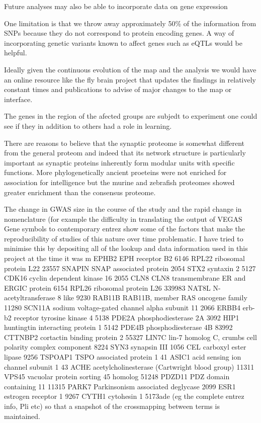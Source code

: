 Future analyses may also be able to incorporate data on gene expression

One limitation is that we throw away approximately 50\% of the information from SNPs because they do not correspond to protein encoding genes. A way of incorporating genetic variants known to affect genes such as eQTLs would be helpful. 

Ideally given the continuous evolution of the map and the analysis we would have an online resource like the fly brain project that updates the findings in relatively constant times and publications to advise of major changes to the map or interface. 

The genes in the region of the afected groups are subjedt to experiment one could see if they in addition to others had a role in learning.

There are reasons to believe that the synaptic proteome is somewhat different from the general proteom and indeed that its network structure is particularly important as synaptic proteins inherently form modular units with specific functions. More phylogenetically ancient proeteins were not enriched for association for intelligence but the murine and zebrafish proteomes showed greater enrichment than the consensus proteome.

The change in GWAS size in the course of the study and the rapid change in nomenclature (for example the difficulty in translating the output of VEGAS Gene symbols to contemporary entrez show some of the factors that make the reproducibility of studies of this nature over time problematic. I have tried to minimise this by depositing all of the lookup and data information used in this project at the time it was m	EPHB2	EPH receptor B2
6146	RPL22	ribosomal protein L22
23557	SNAPIN	SNAP associated protein
2054	STX2	syntaxin 2
5127	CDK16	cyclin dependent kinase 16
2055	CLN8	CLN8 transmembrane ER and ERGIC protein
6154	RPL26	ribosomal protein L26
339983	NAT8L	N-acetyltransferase 8 like
9230	RAB11B	RAB11B, member RAS oncogene family
11280	SCN11A	sodium voltage-gated channel alpha subunit 11
2066	ERBB4	erb-b2 receptor tyrosine kinase 4
5138	PDE2A	phosphodiesterase 2A
3092	HIP1	huntingtin interacting protein 1
5142	PDE4B	phosphodiesterase 4B
83992	CTTNBP2	cortactin binding protein 2
55327	LIN7C	lin-7 homolog C, crumbs cell polarity complex component
8224	SYN3	synapsin III
1056	CEL	carboxyl ester lipase
9256	TSPOAP1	TSPO associated protein 1
41	ASIC1	acid sensing ion channel subunit 1
43	ACHE	acetylcholinesterase (Cartwright blood group)
11311	VPS45	vacuolar protein sorting 45 homolog
51248	PDZD11	PDZ domain containing 11
11315	PARK7	Parkinsonism associated deglycase
2099	ESR1	estrogen receptor 1
9267	CYTH1	cytohesin 1
5173ade (eg the complete entrez info, Pli etc) so that a snapshot of the crossmapping between terms is maintained. 

